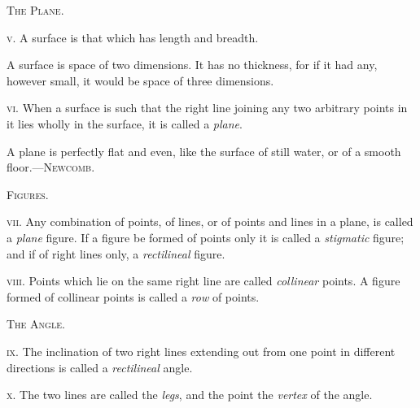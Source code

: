 \documentclass[oneside]{book}
\begin{document}
\begin{center}
\textsc{The Plane.}
\end{center}

\textsc{v.} A surface is that which has length and breadth.

\begin{footnotesize}
A surface is space of two dimensions. It has no thickness, for if
it had any, however small, it would be space of three dimensions.
\par\end{footnotesize}

\textsc{vi.}  When a surface is such that the right line joining
any two arbitrary points in it lies wholly in the
surface, it is called a \textit{plane}.

\begin{footnotesize}
A plane is perfectly flat and even, like the surface of still
water, or of a smooth floor.---\textsc{Newcomb}.
\par\end{footnotesize}

\newpage
\begin{center}
\textsc{Figures.}
\end{center}

\textsc{vii.} Any combination of points, of lines, or of points
and lines in a plane, is called a \textit{plane} figure. If a figure
be formed of points only it is called a \textit{stigmatic} figure;
and if of right lines only, a \textit{rectilineal} figure.

\textsc{viii.} Points which lie on the same right line are
called \textit{collinear} points. A figure formed of collinear
points is called a \textit{row} of points.

\begin{center}
\textsc{The Angle.}
\end{center}

\textsc{ix.} The inclination of two right lines extending out
from one point in different directions is called a \textit{rectilineal}
angle.


\textsc{x.} The two lines are called the \textit{legs}, and the point
the \textit{vertex} of the angle.
\end{document}
